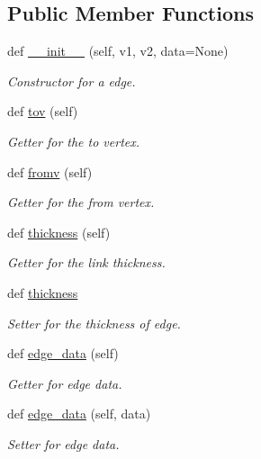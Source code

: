 \subsection*{Public Member Functions}
\begin{DoxyCompactItemize}
\item 
def \hyperlink{classbridges_1_1edge_1_1_edge_a3c5cbf52efec4e42a242bbcee7bc8051}{\+\_\+\+\_\+init\+\_\+\+\_\+} (self, v1, v2, data=None)
\begin{DoxyCompactList}\small\item\em Constructor for a edge. \end{DoxyCompactList}\item 
def \hyperlink{classbridges_1_1edge_1_1_edge_a70e81381eaa6abafd0c40962326351a9}{tov} (self)
\begin{DoxyCompactList}\small\item\em Getter for the to vertex. \end{DoxyCompactList}\item 
def \hyperlink{classbridges_1_1edge_1_1_edge_a63bf9365bcaa4e07d687b845b1d6f9f2}{fromv} (self)
\begin{DoxyCompactList}\small\item\em Getter for the from vertex. \end{DoxyCompactList}\item 
def \hyperlink{classbridges_1_1edge_1_1_edge_a1155b5f604410cd46a81902bb8aa348b}{thickness} (self)
\begin{DoxyCompactList}\small\item\em Getter for the link thickness. \end{DoxyCompactList}\item 
def \hyperlink{classbridges_1_1edge_1_1_edge_a3137a2498d08d998471efde3bc1db1b4}{thickness}
\begin{DoxyCompactList}\small\item\em Setter for the thickness of edge. \end{DoxyCompactList}\item 
def \hyperlink{classbridges_1_1edge_1_1_edge_abc3f52467d38ad2d7e06113d0c714ed6}{edge\+\_\+data} (self)
\begin{DoxyCompactList}\small\item\em Getter for edge data. \end{DoxyCompactList}\item 
def \hyperlink{classbridges_1_1edge_1_1_edge_a7429980b52d754159629c73c316cbc41}{edge\+\_\+data} (self, data)
\begin{DoxyCompactList}\small\item\em Setter for edge data. \end{DoxyCompactList}\item 

\end{DoxyCompactItemize}

